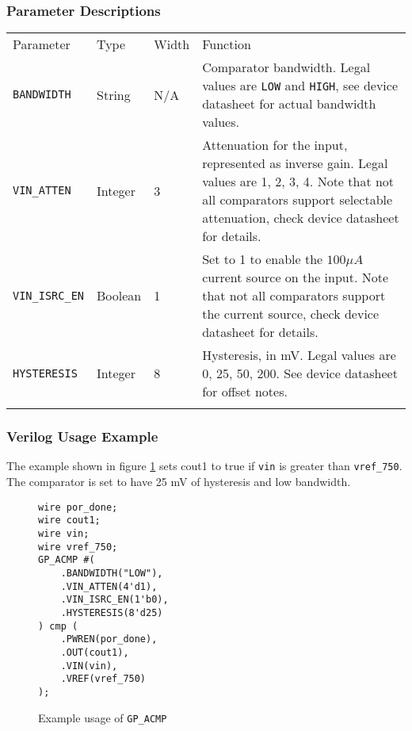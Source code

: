 \documentclass[11pt]{article}
\newcommand{\tokenstyle}[1]{\texttt{#1}}
\newcommand{\wirestyle}[1]{\texttt{#1}}
\newcommand{\valuestyle}[1]{\texttt{#1}}
\newcommand{\strvaluestyle}[1]{\valuestyle{\textquotedbl#1\textquotedbl}}
\newcommand{\whenstyle}[1]{{\fontseries{sb}\selectfont#1}}
\newcommand{\thinhline}{\Xhline{1\arrayrulewidth}}
\newcommand{\thickhline}{\Xhline{2.5\arrayrulewidth}}
\begin{document}
\subsubsection{Parameter Descriptions}

\begin{tabularx}{\textwidth}{lllX}
\thinhline
\whenstyle{Parameter} & \whenstyle{Type} & \whenstyle{Width} & \whenstyle{Function} \\
\thickhline
\tokenstyle{BANDWIDTH} & String & N/A &
	Comparator bandwidth. Legal values are \strvaluestyle{LOW} and \strvaluestyle{HIGH}, see device datasheet for actual bandwidth values. \\
\thinhline
\tokenstyle{VIN\_ATTEN} & Integer & 3 &
	Attenuation for the input, represented as inverse gain. Legal values are 1, 2, 3, 4. Note that not all comparators support selectable attenuation, check device datasheet for details.\\
\thinhline
\tokenstyle{VIN\_ISRC\_EN} & Boolean & 1 &
	Set to 1 to enable the $100 \mu A$ current source on the input. Note that not all comparators support the current
	source, check device datasheet for details.\\
\thinhline
\tokenstyle{HYSTERESIS} & Integer & 8 &
	Hysteresis, in mV. Legal values are 0, 25, 50, 200. See device datasheet for offset notes.\\
\thinhline
\end{tabularx}

\subsubsection{Verilog Usage Example}

The example shown in figure \ref{gp-acmp-example} sets cout1 to true if \wirestyle{vin} is greater than \wirestyle{vref\_750}. The comparator is set to have 25 mV of hysteresis and low bandwidth.

\begin{figure}[h]
\begin{lstlisting}
wire por_done;
wire cout1;
wire vin;
wire vref_750;
GP_ACMP #(
	.BANDWIDTH("LOW"),
	.VIN_ATTEN(4'd1),
	.VIN_ISRC_EN(1'b0),
	.HYSTERESIS(8'd25)
) cmp (
	.PWREN(por_done),
	.OUT(cout1),
	.VIN(vin),
	.VREF(vref_750)
);
\end{lstlisting}
\caption{Example usage of \tokenstyle{GP\_ACMP}}
\label{gp-acmp-example}
\end{figure}

\end{document}
